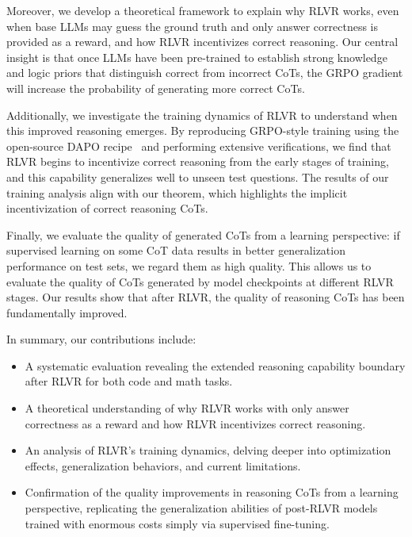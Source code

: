 Moreover, we develop a theoretical framework to explain why RLVR works, even when base LLMs may guess the ground truth and only answer correctness is provided as a reward, and how RLVR incentivizes correct reasoning. Our central insight is that once LLMs have been pre-trained to establish strong knowledge and logic priors that distinguish correct from incorrect CoTs, the GRPO gradient will increase the probability of generating more correct CoTs.

Additionally, we investigate the training dynamics of RLVR to understand when this improved reasoning emerges. By reproducing GRPO-style training using the open-source DAPO recipe~\citep{yu2025DAPO-Zero} and performing extensive verifications, we find that RLVR begins to incentivize correct reasoning from the early stages of training, and this capability generalizes well to unseen test questions. The results of our training analysis align with our theorem, which highlights the implicit incentivization of correct reasoning CoTs.

Finally, we evaluate the quality of generated CoTs from a learning perspective: if supervised learning on some CoT data results in better generalization performance on test sets, we regard them as high quality. This allows us to evaluate the quality of CoTs generated by model checkpoints at different RLVR stages. Our results show that after RLVR, the quality of reasoning CoTs has been fundamentally improved.

In summary, our contributions include:
\begin{itemize}
    \item A systematic evaluation revealing the extended reasoning capability boundary after RLVR for both code and math tasks.
    \item A theoretical understanding of why RLVR works with only answer correctness as a reward and how RLVR incentivizes correct reasoning.
    \item An analysis of RLVR's training dynamics, delving deeper into optimization effects, generalization behaviors, and current limitations.
    \item Confirmation of the quality improvements in reasoning CoTs from a learning perspective, replicating the generalization abilities of post-RLVR models trained with enormous costs simply via supervised fine-tuning.
\end{itemize}

